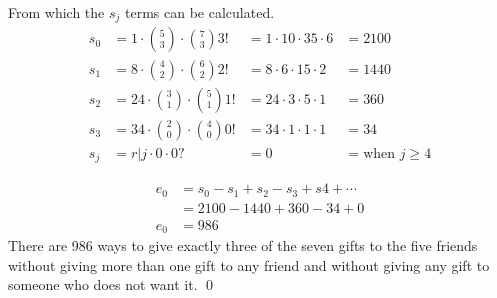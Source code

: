 \documentclass{article}
\begin{document}
From which the $ s_j $ terms can be calculated.
\begin{equation}
\begin{array}{rccc}
 s_0 &= 1 \cdot \binom{5}{3} \cdot \binom{7}{3} 3! &=  1 \cdot 10 \cdot 35 \cdot 6 &= 2100 \\
 s_1 &= 8 \cdot \binom{4}{2} \cdot \binom{6}{2} 2! &=  8 \cdot 6 \cdot 15 \cdot 2 &= 1440 \\
 s_2 &= 24 \cdot \binom{3}{1} \cdot \binom{5}{1} 1! &= 24 \cdot 3 \cdot 5 \cdot 1&= 360 \\
 s_3 &= 34 \cdot \binom{2}{0} \cdot \binom{4}{0} 0! &=  34 \cdot 1 \cdot 1 \cdot 1 &= 34 \\
 s_j &= r|j \cdot 0\cdot 0 ? &=  0 &= \text{when } j \ge 4
\end{array}
\end{equation}

\begin{align}
 e_0 &= s_0 - s_1 + s_2 - s_3 + s4 + \cdots \\
  &= 2100 - 1440 + 360 - 34 + 0 \\
e_0 &= 986
\end{align}
There are 986 ways to give exactly three of the seven gifts to the five friends 
without giving more than one gift to any friend and without giving any gift
to someone who does not want it.
\qed
\end{document}
